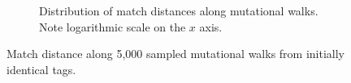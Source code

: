 \begin{figure}[!htbp]
\begin{center}
\begin{subfigure}[b]{\linewidth}
\begin{minipage}{\linewidth}
\end{minipage}
\begin{minipage}{\linewidth}
\caption{
Distribution of match distances along mutational walks.
Note logarithmic scale on the $x$ axis.
}
\end{minipage}
\end{subfigure}

\caption{
Match distance along 5,000 sampled mutational walks from initially identical tags.
}
\label{fig:mutational_walk_barplot}

\end{center}
\end{figure}
